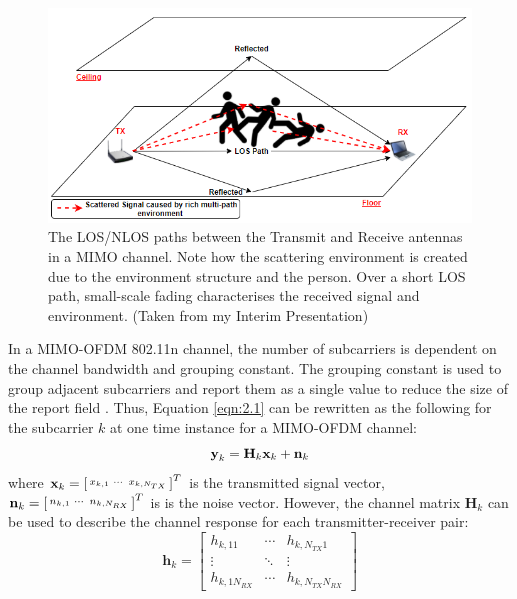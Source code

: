 \begin{figure}[H]
    \centering
    \includegraphics[scale=0.7]{Figures/tempInterim.PNG}
    \caption{The LOS/NLOS paths between the Transmit and Receive antennas in a MIMO channel. Note how the scattering environment is created due to the environment structure and the person. Over a short LOS path, small-scale fading characterises the received signal and environment. (Taken from my Interim Presentation)}
    \label{fig:LOS_NLOS}
\end{figure}
In a MIMO-OFDM 802.11n channel, the number of subcarriers is dependent on the channel bandwidth and grouping constant. The grouping constant is used to group adjacent subcarriers and report them as a single value to reduce the size of the report field \citep{full802.11nStandard}. Thus, Equation \ref{eqn:2.1} can be rewritten as the following for the subcarrier $k$ at one time instance for a MIMO-OFDM channel:
\vspace{-11pt}
\begin{equation}\label{eqn:2.2}
    \textbf{y}_k = \textbf{H}_k\textbf{x}_k+\textbf{n}_k
    \vspace{-11pt}
\end{equation}
where $\textbf{x}_k = \begin{bsmallmatrix}x_{k,1} & \cdots & x_{k,N_{TX}}\end{bsmallmatrix}^T$ is the transmitted signal vector, $\textbf{n}_k = \begin{bsmallmatrix}n_{k,1} & \cdots & n_{k,N_{RX}}\end{bsmallmatrix}^T$ is is the noise vector. However, the channel matrix $\textbf{H}_{k}$ can be used to describe the channel response for each transmitter-receiver pair: 
\vspace{-6.5pt}
\begin{equation}\label{eqn:2.3}
\textbf{h}_{k}=\left[
\begin{array}{ccc}
    h_{k,11} & \cdots & h_{k,N_{TX}1} \\
   \vdots & \ddots & \vdots \\
    h_{k,1N_{RX}} & \cdots & h_{k,N_{TX}N_{RX}}
\end{array}
\right]
\end{equation}
